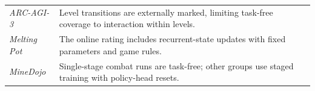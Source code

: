 \begin{table}[t]
{\begin{minipage}{\dimexpr\linewidth-2\fboxsep\relax}
\begin{tabular}{@{}ll@{}}
                \emph{ARC-AGI-3} & Level transitions are externally marked, limiting task-free coverage to interaction within levels. \\
                \emph{Melting Pot} & The online rating includes recurrent-state updates with fixed parameters and game rules. \\
                \emph{MineDojo} & Single-stage combat runs are task-free; other groups use staged training with policy-head resets. \\
            \end{tabular}
        \end{minipage}%
    }
\end{table}
